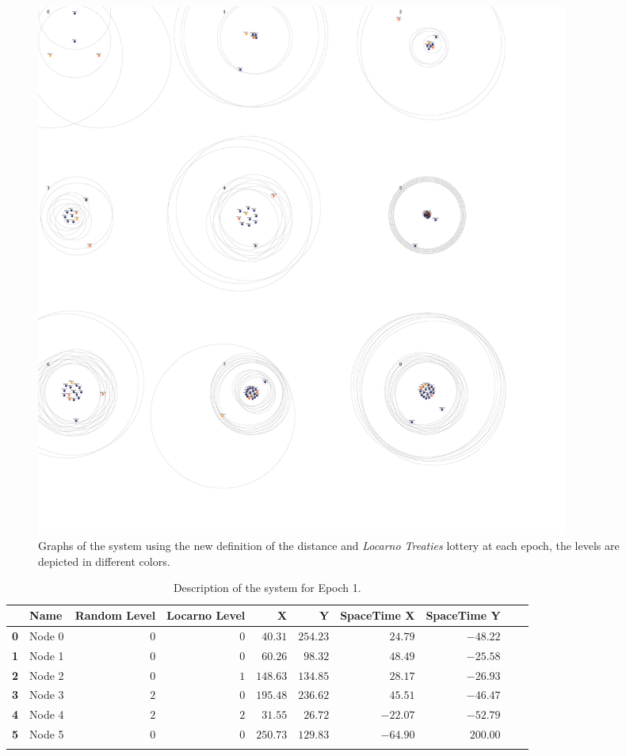 \documentclass[a4paper,11pt,twoside=semi,openright]{report}
\begin{document}
\begin{figure}[!h] 
\centering
\includegraphics[width=500pt]{figures/SpaceTime-Locarno}
\caption{Graphs of the system using the new definition of the distance and
    \textit{Locarno Treaties} lottery at each epoch, the levels are depicted in
    different colors.} \label{fig:SpaceTime-Locarno}
\end{figure}

\begin{table}[h]
\centering
\tiny
\begin{tabular}{@{}llrrrrrrll@{}}
\toprule
& \textbf{Name}   &\textbf{Random Level} &\textbf{Locarno Level} & \textbf{X} & \textbf{Y} & \textbf{SpaceTime X} & \textbf{SpaceTime Y}  \\ \midrule
\textbf{0} & Node 0&$0$&$0$&$40.31$&$254.23$&$24.79$&$-48.22$&\\ \hdashline
\textbf{1} & Node 1&$0$&$0$&$60.26$&$98.32$&$48.49$&$-25.58$&\\ \hdashline
\textbf{2} & Node 2&$0$&$1$&$148.63$&$134.85$&$28.17$&$-26.93$&\\ \hdashline
\textbf{3} & Node 3&$2$&$0$&$195.48$&$236.62$&$45.51$&$-46.47$&\\ \hdashline
\textbf{4} & Node 4&$2$&$2$&$31.55$&$26.72$&$-22.07$&$-52.79$&\\ \hdashline
\textbf{5} & Node 5&$0$&$0$&$250.73$&$129.83$&$-64.90$&$200.00$&\\ \hdashline\midrule
\bottomrule
\end{tabular}
\caption{Description of the system for Epoch 1.}
\end{table}
\end{document}
